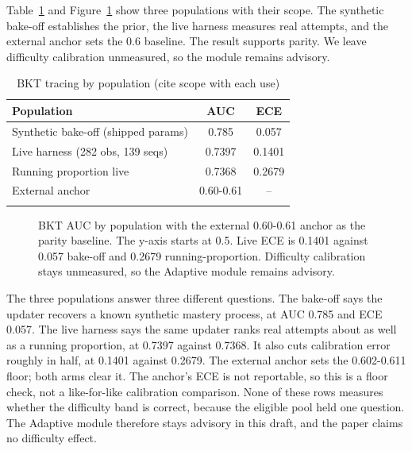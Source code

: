 \documentclass[sn-mathphys,Numbered]{sn-jnl}%
\theoremstyle{thmstyleone}%
\theoremstyle{thmstyletwo}%
\theoremstyle{thmstylethree}%
\begin{document}
Table~\ref{tab:bkt} and Figure~\ref{fig:bktauc} show three populations with their scope. The synthetic bake-off establishes the prior, the live harness measures real attempts, and the external anchor sets the 0.6 baseline. The result supports parity. We leave difficulty calibration unmeasured, so the module remains advisory.

\begin{table}[htbp]
\caption{BKT tracing by population (cite scope with each use)}\label{tab:bkt}%
\begin{tabular*}{\textwidth}{@{\extracolsep\fill}lcc@{}}
\toprule
Population & AUC & ECE \\
\midrule
Synthetic bake-off (shipped params) & 0.785 & 0.057 \\
Live harness (282 obs, 139 seqs) & 0.7397 & 0.1401 \\
Running proportion live & 0.7368 & 0.2679 \\
External anchor & 0.60-0.61 & -- \\
\botrule
\end{tabular*}
\end{table}

\begin{figure}[htbp]%
\centering
{}
\caption{BKT AUC by population with the external 0.60-0.61 anchor as the parity baseline. The y-axis starts at 0.5. Live ECE is 0.1401 against 0.057 bake-off and 0.2679 running-proportion. Difficulty calibration stays unmeasured, so the Adaptive module remains advisory.}\label{fig:bktauc}
\end{figure}

The three populations answer three different questions. The bake-off says the updater recovers a known synthetic mastery process, at AUC 0.785 and ECE 0.057. The live harness says the same updater ranks real attempts about as well as a running proportion, at 0.7397 against 0.7368. It also cuts calibration error roughly in half, at 0.1401 against 0.2679. The external anchor sets the 0.602-0.611 floor; both arms clear it. The anchor's ECE is not reportable, so this is a floor check, not a like-for-like calibration comparison. None of these rows measures whether the difficulty band is correct, because the eligible pool held one question. The Adaptive module therefore stays advisory in this draft, and the paper claims no difficulty effect.
\end{document}
